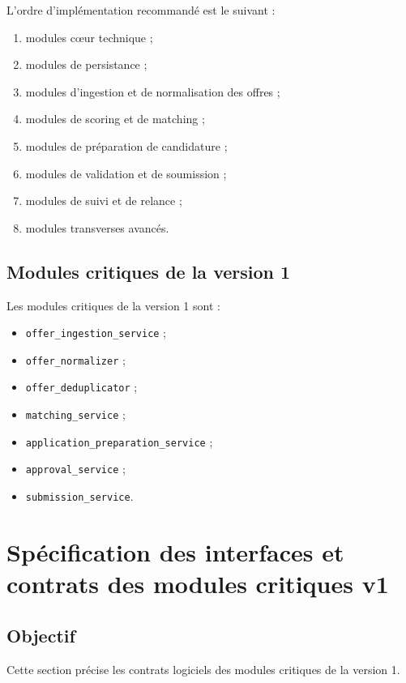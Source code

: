 \documentclass[11pt,a4paper]{article}
\begin{document}
L’ordre d’implémentation recommandé est le suivant :

\begin{enumerate}
    \item modules cœur technique ;
    \item modules de persistance ;
    \item modules d’ingestion et de normalisation des offres ;
    \item modules de scoring et de matching ;
    \item modules de préparation de candidature ;
    \item modules de validation et de soumission ;
    \item modules de suivi et de relance ;
    \item modules transverses avancés.
\end{enumerate}

\subsection{Modules critiques de la version 1}

Les modules critiques de la version 1 sont :

\begin{itemize}
    \item \texttt{offer\_ingestion\_service} ;
    \item \texttt{offer\_normalizer} ;
    \item \texttt{offer\_deduplicator} ;
    \item \texttt{matching\_service} ;
    \item \texttt{application\_preparation\_service} ;
    \item \texttt{approval\_service} ;
    \item \texttt{submission\_service}.
\end{itemize}

\section{Spécification des interfaces et contrats des modules critiques v1}

\subsection{Objectif}

Cette section précise les contrats logiciels des modules critiques de la version 1.
\end{document}
